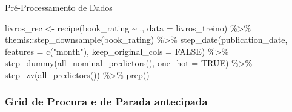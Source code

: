 \documentclass[
  9 pt,
  ignorenonframetext,
]{beamer}
\newenvironment{Shaded}{\begin{snugshade}}{\end{snugshade}}
\newcommand{\AttributeTok}[1]{\textcolor[rgb]{0.77,0.63,0.00}{#1}}
\newcommand{\ConstantTok}[1]{\textcolor[rgb]{0.00,0.00,0.00}{#1}}
\newcommand{\FunctionTok}[1]{\textcolor[rgb]{0.00,0.00,0.00}{#1}}
\newcommand{\NormalTok}[1]{#1}
\newcommand{\OtherTok}[1]{\textcolor[rgb]{0.56,0.35,0.01}{#1}}
\newcommand{\SpecialCharTok}[1]{\textcolor[rgb]{0.00,0.00,0.00}{#1}}
\newcommand{\StringTok}[1]{\textcolor[rgb]{0.31,0.60,0.02}{#1}}
\begin{document}
\begin{frame}[fragile]{Pré-Processamento de Dados}
\begin{Shaded}
\begin{Highlighting}[]
\NormalTok{livros\_rec }\OtherTok{\textless{}{-}} \FunctionTok{recipe}\NormalTok{(book\_rating }\SpecialCharTok{\textasciitilde{}}\NormalTok{ ., }\AttributeTok{data =}\NormalTok{ livros\_treino) }\SpecialCharTok{\%\textgreater{}\%}
\NormalTok{  themis}\SpecialCharTok{::}\FunctionTok{step\_downsample}\NormalTok{(book\_rating) }\SpecialCharTok{\%\textgreater{}\%} 
  \FunctionTok{step\_date}\NormalTok{(publication\_date, }\AttributeTok{features =} \FunctionTok{c}\NormalTok{(}\StringTok{"month"}\NormalTok{), }
            \AttributeTok{keep\_original\_cols =} \ConstantTok{FALSE}\NormalTok{) }\SpecialCharTok{\%\textgreater{}\%}
  \FunctionTok{step\_dummy}\NormalTok{(}\FunctionTok{all\_nominal\_predictors}\NormalTok{(), }\AttributeTok{one\_hot =} \ConstantTok{TRUE}\NormalTok{) }\SpecialCharTok{\%\textgreater{}\%}
  \FunctionTok{step\_zv}\NormalTok{(}\FunctionTok{all\_predictors}\NormalTok{()) }\SpecialCharTok{\%\textgreater{}\%} 
  \FunctionTok{prep}\NormalTok{()}
\end{Highlighting}
\end{Shaded}
\end{frame}

\hypertarget{grid-de-procura-e-de-parada-antecipada}{%
\subsubsection{Grid de Procura e de Parada
antecipada}\label{grid-de-procura-e-de-parada-antecipada}}
\end{document}
